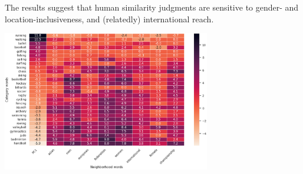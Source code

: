 {The results suggest that human similarity judgments are sensitive to gender- and location-inclusiveness, and (relatedly) international reach.

\begin{center}
    \includegraphics[width=0.68\textwidth]{images/sports.png}
\end{center}
}

